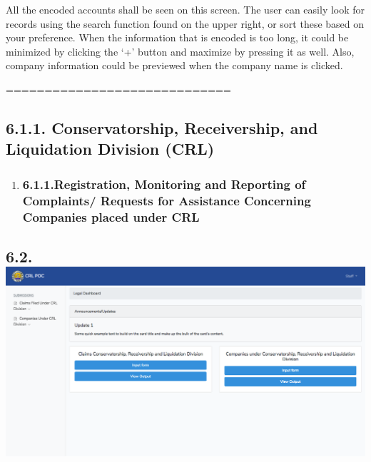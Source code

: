 \documentclass{article}
\begin{document}
\noindent{}All the encoded accounts shall be seen on this screen.
The user can easily look for records using the search function found on
the upper right, or sort these based on your preference. When the
information that is encoded is too long, it could be minimized by
clicking the ‘+’ button and maximize by pressing it as well. Also,
company information could be previewed when the company name is
clicked.%

\mdhr{}%

\noindent{}=============================%

\subsection{6.1.\hspace*{0.5em}1.  Conservatorship, Receivership, and Liquidation Division (CRL)}\label{sec-1-conservatorship-receivership-and-liquidation-division-crl}%

\begin{enumerate}[noitemsep,topsep=\mdcompacttopsep]%

\item{}
\subsubsection{6.1.1.\hspace*{0.5em}Registration, Monitoring and Reporting of Complaints/ Requests for Assistance Concerning Companies placed under CRL}\label{sec-registration-monitoring-and-reporting-of-complaints-requests-for-assistance-concerning-companies-placed-under-crl}%
\end{enumerate}%

\subsection{6.2.\hspace*{0.5em}\includegraphics[keepaspectratio=true]{up-ic-screens/image21}{}}\label{sec-up-ic-screensimage21png}%
\end{document}
